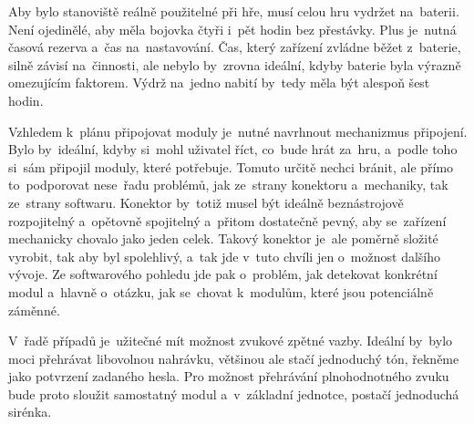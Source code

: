 Aby bylo stanoviště reálně použitelné při hře, musí celou hru vydržet na~baterii.
Není ojedinělé, aby měla bojovka čtyři i~pět hodin bez přestávky.
Plus je~nutná časová rezerva a~čas na~nastavování.
Čas, který zařízení zvládne běžet z~baterie, silně závisí na~činnosti, ale nebylo by~zrovna ideální, kdyby baterie byla výrazně omezujícím faktorem.
Výdrž na~jedno nabití by~tedy měla být alespoň šest hodin.

Vzhledem k~plánu připojovat moduly je~nutné navrhnout mechanizmus připojení.
Bylo by~ideální, kdyby si~mohl uživatel říct, co~bude hrát za~hru, a~podle toho si~sám připojil moduly, které potřebuje.
Tomuto určitě nechci bránit, ale přímo to~podporovat nese~řadu problémů, jak ze~strany konektoru a~mechaniky, tak ze~strany softwaru.
Konektor by~totiž musel být ideálně beznástrojově rozpojitelný a~opětovně spojitelný a~přitom dostatečně pevný, aby se~zařízení mechanicky chovalo jako jeden celek.
Takový konektor je~ale poměrně složité vyrobit, tak aby byl spolehlivý, a~tak jde v~tuto chvíli jen o~možnost dalšího vývoje.
Ze softwarového pohledu jde pak o~problém, jak detekovat konkrétní modul a~hlavně o~otázku, jak se~chovat k~modulům, které jsou potenciálně záměnné.


V~řadě případů je~užitečné mít možnost zvukové zpětné vazby.
Ideální by~bylo moci přehrávat libovolnou nahrávku, většinou ale stačí jednoduchý tón, řekněme jako potvrzení zadaného hesla.
Pro možnost přehrávání plnohodnotného zvuku bude proto sloužit samostatný modul a~v~základní jednotce, postačí jednoduchá sirénka.

